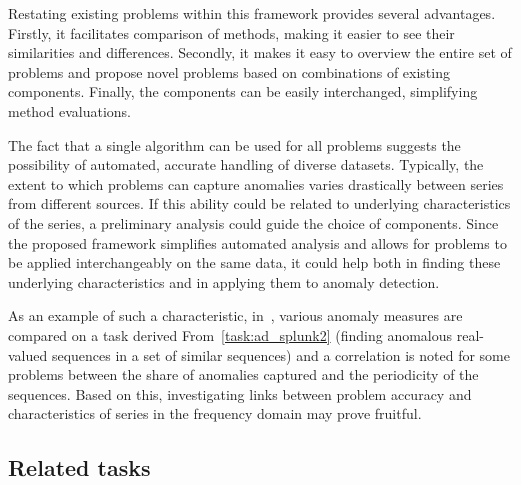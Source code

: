 Restating existing problems within this framework provides several advantages. Firstly, it facilitates comparison of methods, making it easier to see their similarities and differences. Secondly, it makes it easy to overview the entire set of problems and propose novel problems based on combinations of existing components. Finally, the components can be easily interchanged, simplifying method evaluations.

The fact that a single algorithm can be used for all problems suggests the possibility of automated, accurate handling of diverse datasets. Typically, the extent to which problems can capture anomalies varies drastically between series from different sources. If this ability could be related to underlying characteristics of the series, a preliminary analysis could guide the choice of components. Since the proposed framework simplifies automated analysis and allows for problems to be applied interchangeably on the same data, it could help both in finding these underlying characteristics and in applying them to anomaly detection.

As an example of such a characteristic, in~\cite{chandola3}, various anomaly measures are compared on a task derived From~\ref{task:ad_splunk2} (finding anomalous real-valued sequences in a set of similar sequences) and a correlation is noted for some problems between the share of anomalies captured and the periodicity of the sequences. Based on this, investigating links between problem accuracy and characteristics of series in the frequency domain may prove fruitful.

\subsection{Related tasks}
\label{sect:related_tasks_framework}

